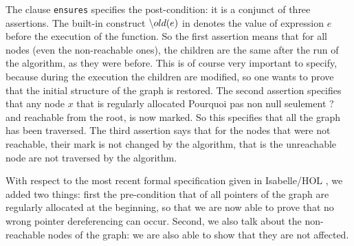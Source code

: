 The clause \texttt{ensures} specifies
the post-condition: it is a conjunct of three assertions. The built-in
construct $\old(e)$ in \caduceus{} denotes the value of expression $e$
before the execution of the function. So the first assertion means
that for all nodes (even the non-reachable ones), the children are the
same after the run of the algorithm, as they were before. This is of
course very important to specify, because during the execution the
children are modified, so one wants to prove that the initial
structure of the graph is restored. The second assertion specifies
that any node $x$ that is regularly allocated {\Huge Pourquoi pas non
  null seulement ?} and reachable 
from the root, is now marked. So this specifies that all the graph has
been traversed. The third assertion says that for the nodes that were
not reachable, their mark is not changed by the algorithm, that is the
unreachable node are not traversed by the algorithm.

With respect to the most recent formal specification given in
Isabelle/HOL \cite{mehta03cade}, we added two things: first the
pre-condition that of all pointers of the graph are regularly
allocated at the beginning, so that we are now able to prove that no
wrong pointer dereferencing can occur. Second, we also talk about the
non-reachable nodes of the graph: we are also able to show that they
are not affected.


